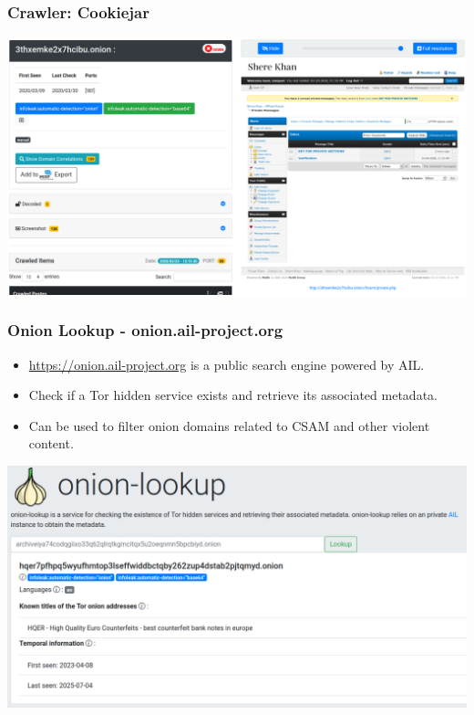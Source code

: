 \documentclass[10pt,aspectratio=169, colorlinks=true, linkcolor=circlBlue]{beamer}
\begin{document}
\begin{frame}
    \frametitle{Crawler: Cookiejar}
    \centerline{
        \includegraphics[scale=0.23]{screenshot/crawler-cookiejar-domain-crawled.png}
    }
\end{frame}

\begin{frame}
    \frametitle{Onion Lookup - onion.ail-project.org}

    \begin{itemize}
        \item \url{https://onion.ail-project.org} is a public search engine powered by AIL.
        \item Check if a Tor hidden service exists and retrieve its associated metadata.
        \item Can be used to filter onion domains related to CSAM and other violent content.
    \end{itemize}

    \begin{center}
        \includegraphics[scale=0.26]{images/onion-lookup.png}
    \end{center}
\end{frame}
\end{document}
